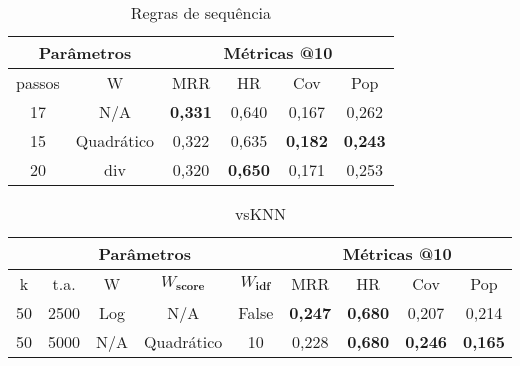 \begin{table}[htbp]
  \centering
  \begin{tabular}{|c|c|c|c|c|c|}
    \hline
      \multicolumn{2}{|c|}{Parâmetros} & \multicolumn{4}{c|}{Métricas @10} \\
      \hline
      passos & W & MRR & HR & Cov & Pop \\
      \hline
      17 & N/A & \textbf{0,331} & 0,640 & 0,167 & 0,262 \\
      \hline
      15 & Quadrático & 0,322 & 0,635 & \textbf{0,182} & \textbf{0,243} \\
      \hline
      20 & div & 0,320 & \textbf{0,650} & 0,171 & 0,253 \\
      \hline

\end{tabular}
      \caption{Regras de sequência}
      \label{opt:sr_last}
\end{table}

\begin{table}[htbp]
  \centering
  \begin{tabular}{|c|c|c|c|c|c|c|c|c|}
    \hline
      \multicolumn{5}{|c|}{Parâmetros} & \multicolumn{4}{c|}{Métricas @10} \\
      \hline
      k & t.a. & W & $W_{\textbf{score}}$ & $W_{\textbf{idf}}$ & MRR & HR & Cov & Pop \\
      \hline
      50 & 2500 & Log & N/A & False & \textbf{0,247} & \textbf{0,680} & 0,207 & 0,214\\
      \hline
      50 & 5000 & N/A & Quadrático & 10 & 0,228 & \textbf{0,680} & \textbf{0,246} & \textbf{0,165}\\
      \hline
\end{tabular}
      \caption{vsKNN}
      \label{opt:vsknn_last}
\end{table}